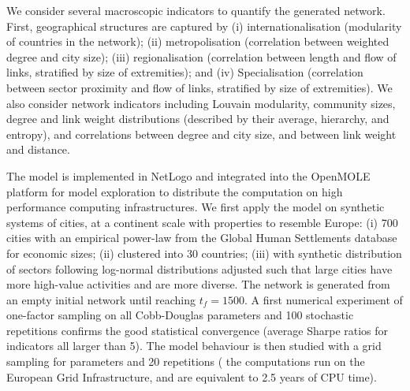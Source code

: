 \documentclass[10pt,letterpaper]{article}
\newcommand{\ea}[1]{{\color{blue}  #1}}
\begin{document}
We consider several macroscopic indicators to quantify the generated network. First, geographical structures are captured by (i) internationalisation (modularity of countries in the network); (ii) metropolisation (correlation between weighted degree and city size); (iii) regionalisation (correlation between length and flow of links, stratified by size of extremities); and (iv) Specialisation (correlation between sector proximity and flow of links, stratified by size of extremities). We also consider network indicators including Louvain modularity, community sizes, degree and link weight distributions (described by their average, hierarchy, and entropy), and correlations between degree and city size, and between link weight and distance.


The model is implemented in NetLogo and integrated into the OpenMOLE platform for model exploration to distribute the computation on high performance computing infrastructures. We first apply the model on synthetic systems of cities, at a continent scale with properties to resemble Europe: (i) 700 cities with an empirical power-law from the Global Human Settlements database for economic sizes; (ii) clustered into 30 countries; (iii) with synthetic distribution of sectors following log-normal distributions adjusted such that large cities have more high-value activities and are more diverse. \ea{The} network is generated from an empty initial network until \ea{reaching} $t_f=1500$. A first numerical experiment of one-factor sampling on all Cobb-Douglas parameters and 100 stochastic repetitions confirms the good statistical convergence (average Sharpe ratios for indicators all larger than 5). \ea{The} model behaviour is then studied with a grid sampling for parameters and 20 repetitions (\ea{the} computations run on the European Grid Infrastructure, \ea{and are} equivalent to 2.5 years of CPU time).
\end{document}
